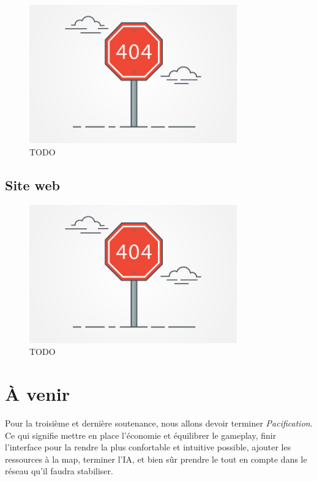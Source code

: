 \documentclass[12pt]{report}
\begin{document}
\begin{figure}[H]
    \centering
    \includegraphics[width=0.8\textwidth]{404}
    \caption{TODO}
\end{figure}

\section*{Site web}

\begin{figure}[H]
    \centering
    \includegraphics[width=0.8\textwidth]{404}
    \caption{TODO}
\end{figure}

\chapter{À venir}

Pour la troisième et dernière soutenance, nous allons devoir terminer \textit{Pacification}. Ce qui signifie mettre en place l'économie et équilibrer le gameplay, finir l'interface pour la rendre la plus confortable et intuitive possible, ajouter les ressources à la map, terminer l'IA, et bien sûr prendre le tout en compte dans le réseau qu'il faudra stabiliser.
\end{document}
